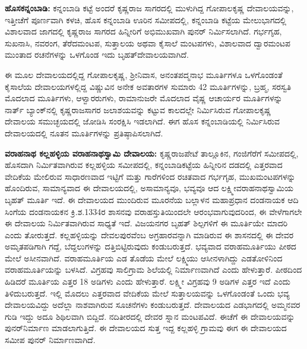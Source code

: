 \textbf{ಹೊಸಕನ್ನಂಬಾಡಿ:} ಕನ್ನಂಬಾಡಿ ಕಟ್ಟೆ ಅಂದರೆ ಕೃಷ್ಣರಾಜ ಸಾಗರದಲ್ಲಿ ಮುಳುಗಿದ್ದ ಗೋಪಾಲಕೃಷ್ಣ ದೇವಾಲಯವನ್ನು, ಇತ್ತೀಚೆಗೆ ಪೂರ್ಣವಾಗಿ ಕಳಚಿ, ಹೊಸ ಕನ್ನಂಬಾಡಿ ಊರಿನ ಸಮೀಪದಲ್ಲಿ, ಕನ್ನಂಬಾಡಿ ಕಟ್ಟೆಯ ಮೇಲುಭಾಗದಲ್ಲಿ ವಿಶಾಲವಾದ ಜಾಗದಲ್ಲಿ ಕೃಷ್ಣರಾಜ ಸಾಗರದ ಹಿನ್ನೀರಿಗೆ ಅಭಿಮುಖವಾಗಿ ಪುನರ್​ ನಿರ್ಮಿಸಲಾಗಿದೆ. ಗರ್ಭಗೃಹ, ಸುಖನಾಸಿ, ನವರಂಗ, ತೆರೆದಮಂಟಪ, ಸುತ್ತಾಲಯ ಅಥವಾ ಕೈಸಾಲೆ ಮಂಟಪಗಳು, ವಿಶಾಲವಾದ ದ್ವಾರಮಂಟಪ ಮುಂತಾದ ರಚನೆಗಳನ್ನು ಒಳಗೊಂಡ ಇದು ಬೃಹತ್​ ದೇವಾಲಯವಾಗಿದೆ.

ಈ ಮೂಲ ದೇವಾಲಯದಲ್ಲಿದ್ದ ಗೋಪಾಲಕೃಷ್ಣ, ಶ‍್ರೀನಿವಾಸ, ಅನಂತಪದ್ಮನಾಭ ಮೂರ್ತಿಗಳೂ ಒಳಗೊಂಡಂತೆ ಕೈಸಾಲೆಯ ದೇವಾಲಯಗಳಲ್ಲಿದ್ದ ವಿಷ್ಣುವಿನ ಅನೇಕ ಅವತಾರಗಳ ಸುಮಾರು 42 ಮೂರ್ತಿಗಳನ್ನು, ಬ್ರಹ್ಮ, ಸರಸ್ವತಿ ಮೊದಲಾದ ಮೂರ್ತಿಗಳು, ಆಳ್ವಾರರುಗಳು, ರಾಮಾನುಜರೇ ಮೊದಲಾದ ವೈಷ್ಣ ಆಚಾರ್ಯರ ಮೂರ್ತಿಗಳನ್ನು ನಾರ್ತ್ ಬ್ಯಾಂಕ್​ನಲ್ಲಿ ಕೃಷ್ಣರಾಜಸಾಗರ ಜಲಾಶಯವನ್ನು ಕಟ್ಟುವ ಕಾಲದಲ್ಲೇ ನಿರ್ಮಿಸಿರುವ ಗೋಪಾಲಕೃಷ್ಣ ದೇವಾಲಯ ಸಮುಚ್ಛಯದಲ್ಲಿ ಜೋಡಿಸಿ ಸಂರಕ್ಷಿಸಿ ಇಡಲಾಗಿದೆ. ಈಗ ಹೊಸ ಕನ್ನಂಬಾಡಿಯಲ್ಲಿ ನಿರ್ಮಿಸಿರುವ ದೇವಾಲಯದಲ್ಲಿ ನೂತನ ಮೂರ್ತಿಗಳನ್ನು ಪ್ರತಿಷ್ಠಾಪಿಸಲಾಗಿದೆ. 

\textbf{ವರಾಹನಾಥ ಕಲ್ಲಹಳ್ಳಿಯ ವರಾಹನಾಥಸ್ವಾಮಿ ದೇವಾಲಯ:} ಕೃಷ್ಣರಾಜಪೇಟೆ ತಾಲ್ಲೂಕಿನ, ಗಂಜಿಗೆರೆಗೆ ಸಮೀಪದಲ್ಲಿ, ಹೊಸದಾಗಿ ನಿರ್ಮಿತವಾಗಿರುವ ಕಲ್ಲಹಳ್ಳಿಯ ಸಮೀಪದಲ್ಲಿ, ಕನ್ನಂಬಾಡಿಕಟ್ಟೆಯ ಹಿನ್ನೀರಿನ ದಡದಲ್ಲಿ ಎತ್ತರವಾದ ವೇದಿಕೆಯ ಮೇಲಿರುವ ಸಾಧಾರಣವಾದ ಇಟ್ಟಿಗೆ ಮತ್ತು ಗಾರೆಗಳಿಂದ ರಚಿತವಾದ ಗರ್ಭಗೃಹ, ಮುಖಮಂಟಪಗಳನ್ನು ಹೊಂದಿರುವ, ಸಾಮಾನ್ಯವಾದ ಈ ದೇವಾಲಯದಲ್ಲಿ, ಅಸಾಮಾನ್ಯವೂ, ಭವ್ಯವೂ ಆದ ಲಕ್ಷ್ಮೀವರಾಹನಾಥಸ್ವಾಮಿಯ ಬೃಹತ್​ ಮೂರ್ತಿ ಇದೆ. ಈ ದೇವಾಲಯದ ಮುಂದಿರುವ ಮೂರನೆಯ ಬಲ್ಲಾಳನ ಮಹಾಪ್ರಧಾನ ದಂಡನಾಯಕ ಆದಿ ಸಿಂಗೆಯ ದಂಡನಾಯಕನ ಕ್ರಿ.ಶ.1334ರ ಶಾಸನವು ವರಾಹಸ್ತುತಿಯಿಂದಲೇ ಆರಂಭವಾಗುವುದರಿಂದ, ಈ ವೇಳೆಗಾಗಲೇ ಈ ದೇವಾಲಯ ನಿರ್ಮಿತವಾಗಿರುವ ಸಾಧ್ಯತೆ ಇದೆ. ವಿಜಯನಗರ ಬೃಹತ್​ ಶಿಲ್ಪಗಳಿಗೆ ಈ ಮೂರ್ತಿಯೇ ಮಾದರಿ ಎಂದು ತೋರುತ್ತದೆ. ಕಲ್ಲಹಳ್ಳಿಯನ್ನು ದೇವಲಪುರವೆಂಬ ಅಗ್ರಹಾರವನ್ನಾಗಿ ಮಾಡಿರುವ ಈ ಶಾಸನದಲ್ಲಿ ಈ ದೇವರ ಅಮೃತಪಡಿಗಾಗಿ ಗದ್ದೆ, ಬೆದ್ದಲುಗಳನ್ನು ದತ್ತಿಬಿಟ್ಟಿರುವುದು ಕಂಡುಬರುತ್ತದೆ. ಭವ್ಯವಾದ ವರಾಹಮೂರ್ತಿಯು ಪೀಠದ ಮೇಲೆ ಅಸೀನವಾಗಿದೆ. ವರಾಹಮೂರ್ತಿಯ ಎಡ ತೊಡೆಯ ಮೇಲೆ ಲಕ್ಷ್ಮಿಯು ಆಸೀನಳಾಗಿದ್ದು ಎಡತೋಳಿನಿಂದ ವರಾಹಮೂರ್ತಿಯನ್ನು ಬಳಸಿದೆ. ವಿಗ್ರಹವು ಸಾಲಿಗ್ರಾಮ ಶಿಲೆಯಲ್ಲಿ ನಿರ್ಮಾಣವಾಗಿದೆ ಎಂದು ಹೇಳುತ್ತಾರೆ. ಪೀಠದಿಂದ ಹಿಡಿದರೆ ಮೂರ್ತಿಯ ಎತ್ತರ 18 ಅಡಿಗಳು ಎಂದು ಹೇಳುತ್ತಾರೆ. ಲಕ್ಷ್ಮೀ ವಿಗ್ರಹವು 9 ಅಡಿಗಳ ಎತ್ತರ ಇದೆ ಎಂದು ತಿಳಿದುಬರುತ್ತದೆ. ಇಲ್ಲಿ ಮೊದಲು ಎತ್ತರವಾದ ವೇದಿಕೆಯ ಮೇಲೆ ಸುತ್ತಾಲಯವನ್ನು ಒಳಗೊಂಡಂತೆ ಒಂದು ಭವ್ಯ ದೇವಾಲಯವಿದ್ದು ಅದೆಲ್ಲಾ ನಾಶವಾಗಿರುವ ಸೂಚನೆಗಳು ಕಂಡುಬರುತ್ತದೆ. ದೇವಾಲಯದ ಎಡಭಾಗದಲ್ಲಿ ಅಮ್ಮನವರ ಗುಡಿ ಇದ್ದು ಅದೂ ಶಿಥಿಲವಾಗಿ ಬಿದ್ದಿದೆ. ನದಿತೀರದಲ್ಲಿ ದೇವರ ಸ್ನಾನ ಮಂಟಪವಿದೆ. ಈಚೆಗೆ ಈ ದೇವಾಲಯವನ್ನು ಪುನರ್​ನಿರ್ಮಾಣ ಮಾಡಲಾಗುತ್ತಿದೆ. ಈ ದೇವಾಲಯದ ಸುತ್ತ ಇದ್ದ ಕಲ್ಲಹಳ್ಳಿ ಗ್ರಾಮವು ಈಗ ಈ ದೇವಾಲಯದ ಸಮೀಪ ಪುನರ್​ ನಿರ್ಮಾಣವಾಗಿದೆ.

